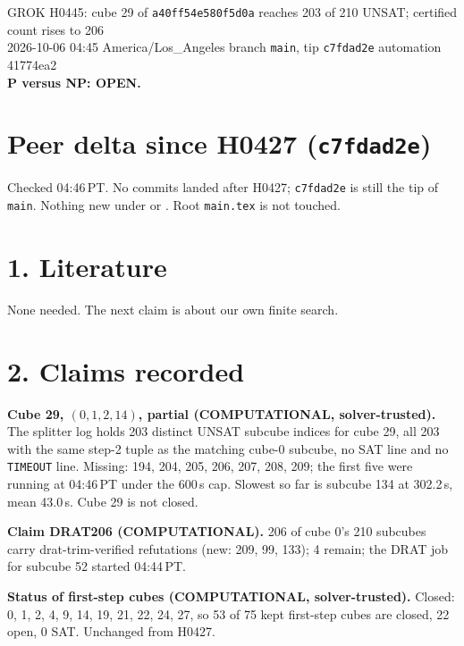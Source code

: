 \documentclass[11pt]{article}
\begin{document}
\sloppy
\begin{center}
{\Large GROK H0445: cube 29 of \texttt{a40ff54e580f5d0a} reaches 203 of 210 UNSAT; certified count rises to 206}\\[4pt]
2026-10-06 04:45 America/Los\_Angeles \quad branch \texttt{main}, tip \texttt{c7fdad2e} \quad automation 41774ea2\\[2pt]
\textbf{P versus NP: OPEN.}
\end{center}

\section*{Peer delta since H0427 (\texttt{c7fdad2e})}
Checked 04:46\,PT. No commits landed after H0427; \texttt{c7fdad2e} is still the tip of \texttt{main}. Nothing new under  or . Root \texttt{main.tex} is not touched.

\section*{1. Literature}
None needed. The next claim is about our own finite search.

\section*{2. Claims recorded}
\textbf{Cube 29, $(0,1,2,14)$, partial (COMPUTATIONAL, solver-trusted).} The splitter log holds 203 distinct UNSAT subcube indices for cube 29, all 203 with the same step-2 tuple as the matching cube-0 subcube, no SAT line and no \texttt{TIMEOUT} line. Missing: 194, 204, 205, 206, 207, 208, 209; the first five were running at 04:46\,PT under the 600\,s cap. Slowest so far is subcube 134 at 302.2\,s, mean 43.0\,s. Cube 29 is not closed.

\textbf{Claim DRAT206 (COMPUTATIONAL).} 206 of cube 0's 210 subcubes carry drat-trim-verified refutations (new: 209, 99, 133); 4 remain; the DRAT job for subcube 52 started 04:44\,PT.

\textbf{Status of first-step cubes (COMPUTATIONAL, solver-trusted).} Closed: 0, 1, 2, 4, 9, 14, 19, 21, 22, 24, 27, so 53 of 75 kept first-step cubes are closed, 22 open, 0 SAT. Unchanged from H0427.
\end{document}

